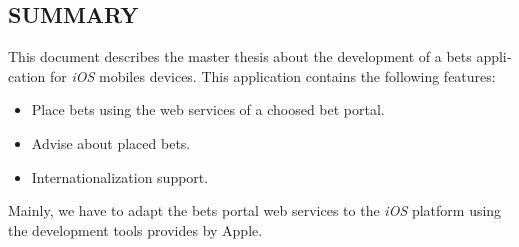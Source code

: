 \begin{otherlanguage}{english}

\chapter*{SUMMARY}

This document describes the master thesis about the development of a bets application for \emph{iOS} mobiles devices. This application contains the following features:
\begin{itemize}
 \item Place bets using the web services of a choosed bet portal.
 \item Advise about placed bets.
 \item Internationalization support.
 \end{itemize}
 Mainly, we have to adapt the bets portal web services to the \emph{iOS} platform using the development tools provides by Apple.


\end{otherlanguage}

